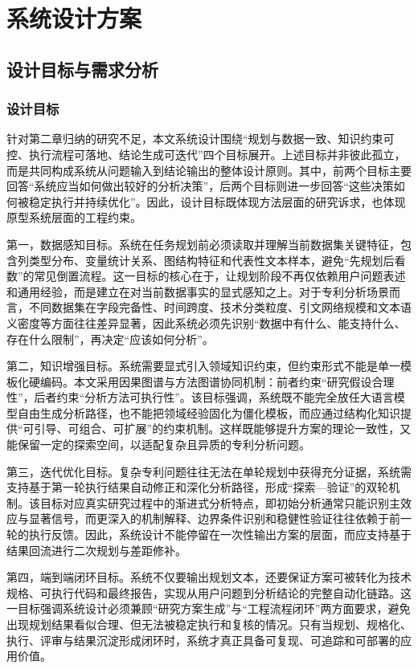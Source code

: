 
\section{系统设计方案}

\subsection{设计目标与需求分析}

\subsubsection{设计目标}

针对第二章归纳的研究不足，本文系统设计围绕“规划与数据一致、知识约束可控、执行流程可落地、结论生成可迭代”四个目标展开。上述目标并非彼此孤立，而是共同构成系统从问题输入到结论输出的整体设计原则。其中，前两个目标主要回答“系统应当如何做出较好的分析决策”，后两个目标则进一步回答“这些决策如何被稳定执行并持续优化”。因此，设计目标既体现方法层面的研究诉求，也体现原型系统层面的工程约束。

第一，数据感知目标。系统在任务规划前必须读取并理解当前数据集关键特征，包含列类型分布、变量统计关系、图结构特征和代表性文本样本，避免“先规划后看数”的常见倒置流程。这一目标的核心在于，让规划阶段不再仅依赖用户问题表述和通用经验，而是建立在对当前数据事实的显式感知之上。对于专利分析场景而言，不同数据集在字段完备性、时间跨度、技术分类粒度、引文网络规模和文本语义密度等方面往往差异显著，因此系统必须先识别“数据中有什么、能支持什么、存在什么限制”，再决定“应该如何分析”。

第二，知识增强目标。系统需要显式引入领域知识约束，但约束形式不能是单一模板化硬编码。本文采用因果图谱与方法图谱协同机制：前者约束“研究假设合理性”，后者约束“分析方法可执行性”\cite{pan2024unifying,liu2016knowledge}。该目标强调，系统既不能完全放任大语言模型自由生成分析路径，也不能把领域经验固化为僵化模板，而应通过结构化知识提供“可引导、可组合、可扩展”的约束机制。这样既能够提升方案的理论一致性，又能保留一定的探索空间，以适配复杂且异质的专利分析问题。

第三，迭代优化目标。复杂专利问题往往无法在单轮规划中获得充分证据，系统需支持基于第一轮执行结果自动修正和深化分析路径，形成“探索—验证”的双轮机制。该目标对应真实研究过程中的渐进式分析特点，即初始分析通常只能识别主效应与显著信号，而更深入的机制解释、边界条件识别和稳健性验证往往依赖于前一轮的执行反馈。因此，系统设计不能停留在一次性输出方案的层面，而应支持基于结果回流进行二次规划与差距修补。

第四，端到端闭环目标。系统不仅要输出规划文本，还要保证方案可被转化为技术规格、可执行代码和最终报告，实现从用户问题到分析结论的完整自动化链路\cite{hong2024metagpt,langgraph2024}。这一目标强调系统设计必须兼顾“研究方案生成”与“工程流程闭环”两方面要求，避免出现规划结果看似合理、但无法被稳定执行和复核的情况。只有当规划、规格化、执行、评审与结果沉淀形成闭环时，系统才真正具备可复现、可追踪和可部署的应用价值。

